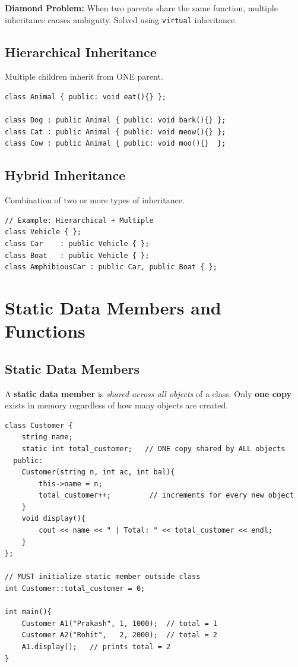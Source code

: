 \documentclass[12pt,a4paper]{report}
\begin{document}
\begin{warnbox}
\textbf{Diamond Problem:} When two parents share the same function, multiple inheritance causes ambiguity.
Solved using \texttt{virtual} inheritance.
\end{warnbox}

\section{Hierarchical Inheritance}
Multiple children inherit from ONE parent.
\begin{lstlisting}
class Animal { public: void eat(){} };

class Dog : public Animal { public: void bark(){} };
class Cat : public Animal { public: void meow(){} };
class Cow : public Animal { public: void moo(){}  };
\end{lstlisting}

\section{Hybrid Inheritance}
Combination of two or more types of inheritance.
\begin{lstlisting}
// Example: Hierarchical + Multiple
class Vehicle { };
class Car    : public Vehicle { };
class Boat   : public Vehicle { };
class AmphibiousCar : public Car, public Boat { };
\end{lstlisting}

\chapter{Static Data Members and Functions}

\section{Static Data Members}

A \textbf{static data member} is \textit{shared across all objects} of a class.
Only \textbf{one copy} exists in memory regardless of how many objects are created.

\begin{lstlisting}[caption={Static data member}]
class Customer {
    string name;
    static int total_customer;   // ONE copy shared by ALL objects
  public:
    Customer(string n, int ac, int bal){
        this->name = n;
        total_customer++;         // increments for every new object
    }
    void display(){
        cout << name << " | Total: " << total_customer << endl;
    }
};

// MUST initialize static member outside class
int Customer::total_customer = 0;

int main(){
    Customer A1("Prakash", 1, 1000);  // total = 1
    Customer A2("Rohit",   2, 2000);  // total = 2
    A1.display();   // prints total = 2
}
\end{lstlisting}
\end{document}
